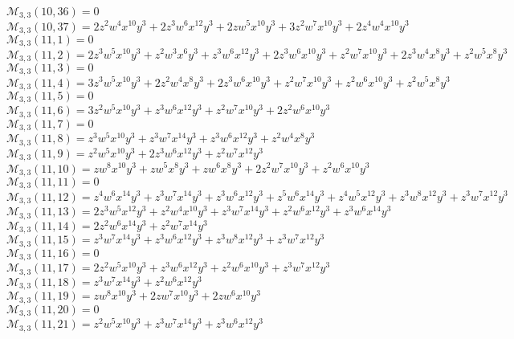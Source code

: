 \documentclass[12pt]{memoireuqam1.3}
\begin{document}
$\mathcal{M}_{3,3}(10,36)=0$\\
$\mathcal{M}_{3,3}(10,37)=2z^2w^4x^{10}y^3+2z^3w^6x^{12}y^3+2zw^5x^{10}y^3+3z^2w^7x^{10}y^3+2z^4w^4x^{10}y^3$\\
$\mathcal{M}_{3,3}(11,1)=0$\\
$\mathcal{M}_{3,3}(11,2)=2z^3w^5x^{10}y^3+z^2w^3x^6y^3+z^3w^6x^{12}y^3+2z^3w^6x^{10}y^3+z^2w^7x^{10}y^3+2z^3w^4x^8y^3+z^2w^5x^8y^3$\\
$\mathcal{M}_{3,3}(11,3)=0$\\
$\mathcal{M}_{3,3}(11,4)=3z^3w^5x^{10}y^3+2z^2w^4x^8y^3+2z^3w^6x^{10}y^3+z^2w^7x^{10}y^3+z^2w^6x^{10}y^3+z^2w^5x^8y^3$\\
$\mathcal{M}_{3,3}(11,5)=0$\\
$\mathcal{M}_{3,3}(11,6)=3z^2w^5x^{10}y^3+z^3w^6x^{12}y^3+z^2w^7x^{10}y^3+2z^2w^6x^{10}y^3$\\
$\mathcal{M}_{3,3}(11,7)=0$\\
$\mathcal{M}_{3,3}(11,8)=z^3w^5x^{10}y^3+z^3w^7x^{14}y^3+z^3w^6x^{12}y^3+z^2w^4x^8y^3$\\
$\mathcal{M}_{3,3}(11,9)=z^2w^5x^{10}y^3+2z^3w^6x^{12}y^3+z^2w^7x^{12}y^3$\\
$\mathcal{M}_{3,3}(11,10)=zw^8x^{10}y^3+zw^5x^8y^3+zw^6x^8y^3+2z^2w^7x^{10}y^3+z^2w^6x^{10}y^3$\\
$\mathcal{M}_{3,3}(11,11)=0$\\
$\mathcal{M}_{3,3}(11,12)=z^4w^6x^{14}y^3+z^3w^7x^{14}y^3+z^3w^6x^{12}y^3+z^5w^6x^{14}y^3+z^4w^5x^{12}y^3+z^3w^8x^{12}y^3+z^3w^7x^{12}y^3$\\
$\mathcal{M}_{3,3}(11,13)=2z^3w^5x^{12}y^3+z^2w^4x^{10}y^3+z^3w^7x^{14}y^3+z^2w^6x^{12}y^3+z^3w^6x^{14}y^3$\\
$\mathcal{M}_{3,3}(11,14)=2z^2w^6x^{14}y^3+z^2w^7x^{14}y^3$\\
$\mathcal{M}_{3,3}(11,15)=z^3w^7x^{14}y^3+z^3w^6x^{12}y^3+z^3w^8x^{12}y^3+z^3w^7x^{12}y^3$\\
$\mathcal{M}_{3,3}(11,16)=0$\\
$\mathcal{M}_{3,3}(11,17)=2z^2w^5x^{10}y^3+z^3w^6x^{12}y^3+z^2w^6x^{10}y^3+z^3w^7x^{12}y^3$\\
$\mathcal{M}_{3,3}(11,18)=z^3w^7x^{14}y^3+z^2w^6x^{12}y^3$\\
$\mathcal{M}_{3,3}(11,19)=zw^8x^{10}y^3+2zw^7x^{10}y^3+2zw^6x^{10}y^3$\\
$\mathcal{M}_{3,3}(11,20)=0$\\
$\mathcal{M}_{3,3}(11,21)=z^2w^5x^{10}y^3+z^3w^7x^{14}y^3+z^3w^6x^{12}y^3$\\
\end{document}
